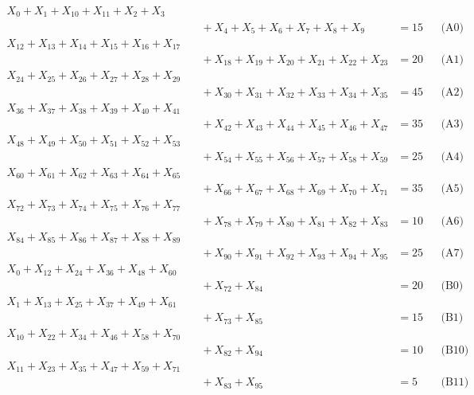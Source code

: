 \documentclass[a4paper,10pt]{article}
\begin{document}
\allowdisplaybreaks
{\small\begin{align}
X_{0} + X_{1} + X_{10} + X_{11} + X_{2} + X_{3} \\[0.5ex]
&\quad  + X_{4} + X_{5} + X_{6} + X_{7} + X_{8} + X_{9} &= 15 && \text{(A0)} \\
X_{12} + X_{13} + X_{14} + X_{15} + X_{16} + X_{17} \\[0.5ex]
&\quad  + X_{18} + X_{19} + X_{20} + X_{21} + X_{22} + X_{23} &= 20 && \text{(A1)} \\
X_{24} + X_{25} + X_{26} + X_{27} + X_{28} + X_{29} \\[0.5ex]
&\quad  + X_{30} + X_{31} + X_{32} + X_{33} + X_{34} + X_{35} &= 45 && \text{(A2)} \\
X_{36} + X_{37} + X_{38} + X_{39} + X_{40} + X_{41} \\[0.5ex]
&\quad  + X_{42} + X_{43} + X_{44} + X_{45} + X_{46} + X_{47} &= 35 && \text{(A3)} \\
X_{48} + X_{49} + X_{50} + X_{51} + X_{52} + X_{53} \\[0.5ex]
&\quad  + X_{54} + X_{55} + X_{56} + X_{57} + X_{58} + X_{59} &= 25 && \text{(A4)} \\
X_{60} + X_{61} + X_{62} + X_{63} + X_{64} + X_{65} \\[0.5ex]
&\quad  + X_{66} + X_{67} + X_{68} + X_{69} + X_{70} + X_{71} &= 35 && \text{(A5)} \\
X_{72} + X_{73} + X_{74} + X_{75} + X_{76} + X_{77} \\[0.5ex]
&\quad  + X_{78} + X_{79} + X_{80} + X_{81} + X_{82} + X_{83} &= 10 && \text{(A6)} \\
X_{84} + X_{85} + X_{86} + X_{87} + X_{88} + X_{89} \\[0.5ex]
&\quad  + X_{90} + X_{91} + X_{92} + X_{93} + X_{94} + X_{95} &= 25 && \text{(A7)} \\
X_{0} + X_{12} + X_{24} + X_{36} + X_{48} + X_{60} \\[0.5ex]
&\quad  + X_{72} + X_{84} &= 20 && \text{(B0)} \\
X_{1} + X_{13} + X_{25} + X_{37} + X_{49} + X_{61} \\[0.5ex]
&\quad  + X_{73} + X_{85} &= 15 && \text{(B1)} \\
X_{10} + X_{22} + X_{34} + X_{46} + X_{58} + X_{70} \\[0.5ex]
&\quad  + X_{82} + X_{94} &= 10 && \text{(B10)} \\
X_{11} + X_{23} + X_{35} + X_{47} + X_{59} + X_{71} \\[0.5ex]
&\quad  + X_{83} + X_{95} &= 5 && \text{(B11)} \\

\end{align}}
\end{document}
